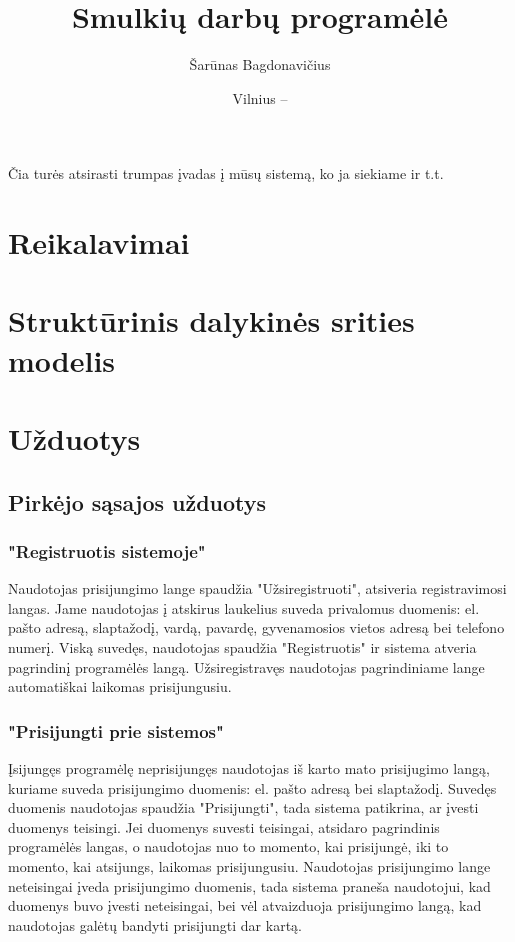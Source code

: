 \documentclass{VUMIFPSbakalaurinis}
\title{Smulkių darbų programėlė}
\author{Šarūnas Bagdonavičius}
\date{Vilnius – \the\year}
\begin{document}
\maketitle
\tableofcontents

Čia turės atsirasti trumpas įvadas į mūsų sistemą, ko ja siekiame ir t.t.

\section{Reikalavimai}

\section{Struktūrinis dalykinės srities modelis}

\section{Užduotys}
\subsection{Pirkėjo sąsajos užduotys}
\subsubsection{"Registruotis sistemoje"}
Naudotojas prisijungimo lange spaudžia "Užsiregistruoti", atsiveria registravimosi langas. Jame naudotojas į atskirus laukelius suveda privalomus duomenis: el. pašto adresą, slaptažodį, vardą, pavardę, gyvenamosios vietos adresą bei telefono numerį. Viską suvedęs, naudotojas spaudžia "Registruotis" ir sistema atveria pagrindinį programėlės langą. Užsiregistravęs naudotojas pagrindiniame lange automatiškai laikomas prisijungusiu.
\subsubsection{"Prisijungti prie sistemos"}
Įsijungęs programėlę neprisijungęs naudotojas iš karto mato prisijugimo langą, kuriame suveda prisijungimo duomenis: el. pašto adresą bei slaptažodį. Suvedęs duomenis naudotojas spaudžia "Prisijungti", tada sistema patikrina, ar įvesti duomenys teisingi. Jei duomenys suvesti teisingai, atsidaro pagrindinis programėlės langas, o naudotojas nuo to momento, kai prisijungė, iki to momento, kai atsijungs, laikomas prisijungusiu.
Naudotojas prisijungimo lange neteisingai įveda prisijungimo duomenis, tada sistema praneša naudotojui, kad duomenys buvo įvesti neteisingai, bei vėl atvaizduoja prisijungimo langą, kad naudotojas galėtų bandyti prisijungti dar kartą.
\end{document}
